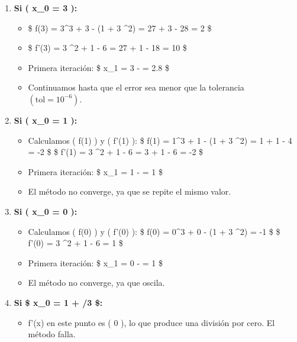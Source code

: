 \documentclass[
  letterpaper,
  DIV=11,
  numbers=noendperiod]{scrartcl}
\providecommand{\tightlist}{%
  \setlength{\itemsep}{0pt}\setlength{\parskip}{0pt}}\usepackage{longtable,booktabs,array}
\begin{document}
\begin{enumerate}
\def\labelenumi{\arabic{enumi}.}
\tightlist
\item
  \textbf{Si ( x\_0 = 3 ):}

  \begin{itemize}
  \tightlist
  \item
    \$ f(3) = 3\^{}3 + 3 - (1 + 3 \^{}2) = 27 + 3 - 28 = 2 \$
  \item
    \$ f'(3) = 3 \^{}2 + 1 - 6  = 27 + 1 - 18 = 10 \$
  \item
    Primera iteración: \$ x\_1 = 3 -  = 2.8 \$
  \item
    Continuamos hasta que el error sea menor que la tolerancia
    \(( \text{tol} = 10^{-6} )\).
  \end{itemize}
\item
  \textbf{Si ( x\_0 = 1 ):}

  \begin{itemize}
  \tightlist
  \item
    Calculamos ( f(1) ) y ( f'(1) ): \$ f(1) = 1\^{}3 + 1 - (1 + 3
    \^{}2) = 1 + 1 - 4 = -2 \$ \$ f'(1) = 3 \^{}2 + 1 - 6
     = 3 + 1 - 6 = -2 \$
  \item
    Primera iteración: \$ x\_1 = 1 -  = 1 \$
  \item
    El método no converge, ya que se repite el mismo valor.
  \end{itemize}
\item
  \textbf{Si ( x\_0 = 0 ):}

  \begin{itemize}
  \tightlist
  \item
    Calculamos ( f(0) ) y ( f'(0) ): \$ f(0) = 0\^{}3 + 0 - (1 + 3
    \^{}2) = -1 \$ \$ f'(0) = 3 \^{}2 + 1 - 6  = 1
    \$
  \item
    Primera iteración: \$ x\_1 = 0 -  = 1 \$
  \item
    El método no converge, ya que oscila.
  \end{itemize}
\item
  \textbf{Si \$ x\_0 = 1 + /3 \$:}

  \begin{itemize}
  \tightlist
  \item
    f'(x) en este punto es ( 0 ), lo que produce una división por cero.
    El método falla.
  \end{itemize}
\end{enumerate}
\end{document}
